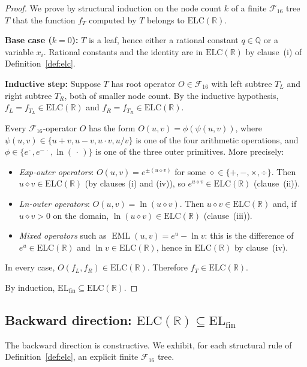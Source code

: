 \documentclass[12pt,a4paper]{article}
\theoremstyle{definition}
\newcommand{\EML}{\operatorname{EML}}
\newcommand{\F}{\mathcal{F}_{16}}
\newcommand{\ELfin}{\mathrm{EL}_{\mathrm{fin}}}
\newcommand{\ELC}{\mathrm{ELC}(\mathbb{R})}
\newcommand{\Q}{\mathbb{Q}}
\begin{document}
\begin{proof}
We prove by structural induction on the node count $k$ of a finite $\F$ tree $T$
that the function $f_T$ computed by $T$ belongs to $\ELC$.

\textbf{Base case ($k=0$):}  $T$ is a leaf, hence either a rational constant
$q\in\Q$ or a variable $x_i$.  Rational constants and the identity are in $\ELC$
by clause~(i) of Definition~\ref{def:elc}.

\textbf{Inductive step:}  Suppose $T$ has root operator $O\in\F$ with left
subtree $T_L$ and right subtree $T_R$, both of smaller node count.  By the
inductive hypothesis, $f_L = f_{T_L}\in\ELC$ and $f_R = f_{T_R}\in\ELC$.

Every $\F$-operator $O$ has the form $O(u,v) = \phi(\psi(u,v))$, where
$\psi(u,v)\in\{u+v, u-v, u\cdot v, u/v\}$ is one of the four arithmetic
operations, and $\phi\in\{e^{\,\cdot\,}, e^{-\,\cdot\,}, \ln(\,\cdot\,)\}$ is
one of the three outer primitives.  More precisely:
\begin{itemize}
  \item \emph{Exp-outer operators}: $O(u,v) = e^{\pm(u \diamond v)}$ for some
        $\diamond\in\{+,-,\times,\div\}$.  Then $u\diamond v\in\ELC$ (by
        clauses (i) and (iv)), so $e^{u\diamond v}\in\ELC$ (clause~(ii)).
  \item \emph{Ln-outer operators}: $O(u,v) = \ln(u\diamond v)$.  Then
        $u\diamond v\in\ELC$ and, if $u\diamond v>0$ on the domain, $\ln(u\diamond
        v)\in\ELC$ (clause~(iii)).
  \item \emph{Mixed operators} such as $\EML(u,v)=e^u-\ln v$: this is the
        difference of $e^u\in\ELC$ and $\ln v\in\ELC$, hence in $\ELC$ by
        clause~(iv).
\end{itemize}
In every case, $O(f_L,f_R)\in\ELC$.  Therefore $f_T\in\ELC$.

By induction, $\ELfin\subseteq\ELC$.
\end{proof}

\subsection{Backward direction: \texorpdfstring{$\ELC\subseteq\ELfin$}{ELC ⊆ ELfin}}
\label{ssec:backward}

The backward direction is constructive.  We exhibit, for each structural rule
of Definition~\ref{def:elc}, an explicit finite $\F$ tree.
\end{document}
